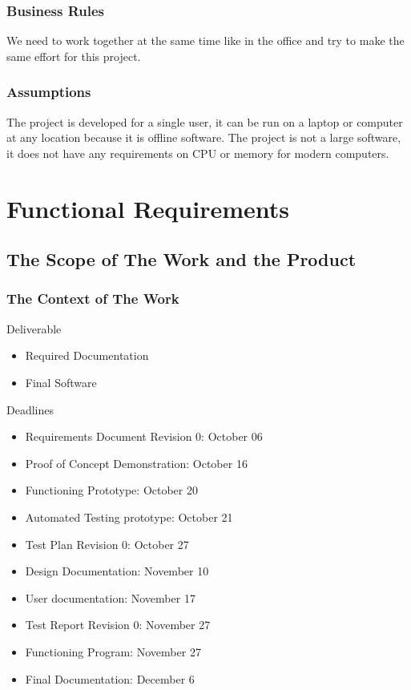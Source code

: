 \documentclass[10pt]{article}
\begin{document}
\subsubsection{Business Rules}
We need to work together at the same time like in the office and try to make the same effort for this project.
\subsubsection{Assumptions}
The project is developed for a single user, it can be run on a laptop or computer at any location because it is offline software. The project is not a large software, it does not have any requirements on CPU or memory for modern computers.
\section{Functional Requirements}
\subsection{The Scope of The Work and the Product}
\subsubsection{The Context of The Work}
Deliverable
	\begin{itemize}
		\item Required Documentation
		\item Final Software
	\end{itemize}
	Deadlines
	\begin{itemize}
		\item Requirements Document Revision 0:  October 06
		\item Proof of Concept Demonstration:			October 16
		\item Functioning Prototype: 			October 20
		\item Automated Testing prototype:       October 21
		\item Test Plan Revision 0:        		October 27
		\item Design Documentation:				November 10
		\item User documentation:				November 17
		\item Test Report Revision 0:			November 27
		\item Functioning Program:				
		November 27
		\item Final Documentation:				December 6
	\end{itemize}
\end{document}
